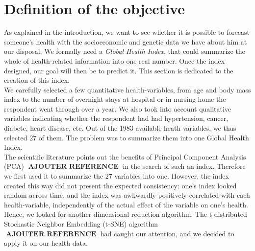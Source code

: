 \documentclass[]{article}
\DeclareMathOperator*{\addref}{\textbf{AJOUTER REFERENCE}}
\begin{document}
\section{Definition of the objective}
As explained in the introduction, we want to see whether it is possible to forecast someone's health with the socioeconomic and genetic data we have about him at our disposal. We formally need a \textit{Global Health Index}, that could summarize the whole of health-related information into one real number. Once the index designed, our goal will then be to predict it. This section is dedicated to the creation of this index.\\

\noindent
We carefully selected a few quantitative health-variables, from age and body mass index to the number of overnight stays at hospital or in nursing home the respondent went through over a year. We also took into account qualitative variables indicating whether the respondent had had hypertension, cancer, diabete, heart disease, etc. Out of the 1983 available heath variables, we thus selected $27$ of them. The problem was to summarize them into one Global Health Index.\\

\noindent
The scientific literature points out the benefits of Principal Component Analysis (PCA) $\addref$ in the search of such an index. Therefore we first used it to summarize the $27$ variables into one. However, the index created this way did not present the expected consistency: one's index looked random across time, and the index was awkwardly positively correlated with each health-variable, independently of the actual effect of the variable on one's health.\\

\noindent
Hence, we looked for another dimensional reduction algorithm. The t-distributed Stochastic Neighbor Embedding (t-SNE) algorithm $\addref$ had caught our attention, and we decided to apply it on our health data.
\end{document}
